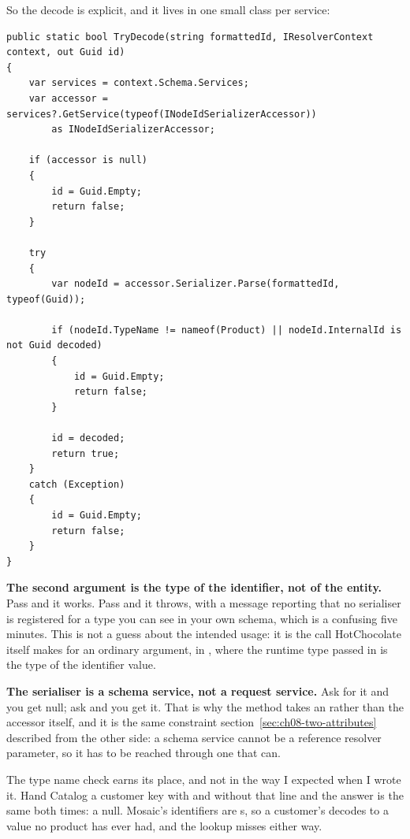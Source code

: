 %
So the decode is explicit, and it lives in one small class per service:

\begin{verbatim}
public static bool TryDecode(string formattedId, IResolverContext context, out Guid id)
{
    var services = context.Schema.Services;
    var accessor = services?.GetService(typeof(INodeIdSerializerAccessor))
        as INodeIdSerializerAccessor;

    if (accessor is null)
    {
        id = Guid.Empty;
        return false;
    }

    try
    {
        var nodeId = accessor.Serializer.Parse(formattedId, typeof(Guid));

        if (nodeId.TypeName != nameof(Product) || nodeId.InternalId is not Guid decoded)
        {
            id = Guid.Empty;
            return false;
        }

        id = decoded;
        return true;
    }
    catch (Exception)
    {
        id = Guid.Empty;
        return false;
    }
}
\end{verbatim}

\medskip\noindent\textbf{The second argument is the type of the identifier, not
of the entity.} Pass  and it works. Pass
 and it throws, with a message reporting that no
serialiser is registered for a type you can see in your own schema, which is a
confusing five minutes. This is not a guess about the intended usage: it is the
call HotChocolate itself makes for an ordinary \code{[ID]} argument, in
, where the runtime type passed in is the type
of the identifier value.

\medskip\noindent\textbf{The serialiser is a schema service, not a request
service.} Ask  for it and you get null; ask
 and you get it. That is why the method takes an
 rather than the accessor itself, and it is the same
constraint section~\ref{sec:ch08-two-attributes} described from the other side:
a schema service cannot be a reference resolver parameter, so it has to be
reached through one that can.

\medskip
The type name check earns its place, and not in the way I expected when I wrote
it. Hand Catalog a customer key with and without that line and the answer is the
same both times: a null. Mosaic's identifiers are s, so a customer's
decodes to a value no product has ever had, and the lookup misses either way.

